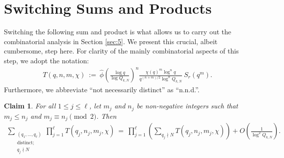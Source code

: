 \documentclass[12pt, reqno,oneside]{amsart}
\theoremstyle{plain}
\newtheorem{claim}[theorem]{Claim}
\theoremstyle{definition}
\theoremstyle{remark}
\theoremstyle{plain}
\numberwithin{equation}{section}
\begin{document}
\appendix

%
%

\section{Switching Sums and Products}\label{app:a}
Switching the following sum and product is what allows us to carry out the combinatorial analysis in Section \ref{sec:5}. We present this crucial, albeit cumbersome, step here. For clarity of the mainly combinatorial aspects of this step, we adopt the notation: 
\begin{align}
T(q,n,m,\chi)\ := \ \widehat{\phi}\left(\frac{\log q}{\log Q_{k,N}}\right)^{n}\frac{\chi(q)^{m}\log^{n} q}{q^{(n+m)/2}\log^{n} Q_{k,N}} \ S_r\left(q^{m}\right).
\end{align} Furthermore, we abbreviate ``not necessarily distinct'' as ``n.n.d.''. 
\begin{claim} 
For all $1\leq j\leq \ell$, let $m_j$ and $n_j$ be non-negative integers such that $m_j\leq n_j$ and $m_j\equiv n_j\pmod{2}$. Then 
\begin{align}\nonumber
\sum_{\substack{(q_1,\dots,q_\ell) \\ \text{distinct;} \\ q_j\nmid N}}\prod_{j=1}^\ell T(q_j,n_j,m_j,\chi) \ = \ \prod_{j=1}^\ell\left(\sum_{q_j\nmid N}T(q_j,n_j,m_j,\chi)\right) + O\left(\frac{1}{\log^2 Q_{k,N}}\right).
\end{align}
\end{claim}
\end{document}
